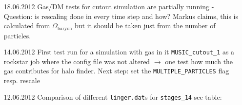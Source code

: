 \begin{itemize}
\item[18.06.2012]
Gas/DM tests for cutout simulation are partially running - Question: is 
rescaling done in every time step and how? Markus claims, this is calculated 
from $\Omega_{\text{baryon}}$ but it should be taken just from the number 
of particles. 


\item[14.06.2012]
First test run for a simulation with gas in it \texttt{MUSIC\_cutout\_1} 
as a rockstar job where the config file was not altered $\rightarrow$ 
one test how much the gas contributes for halo finder. Next step: 
set the \texttt{MULTIPLE\_PARTICLES} flag resp. rescale \\

\item[12.06.2012]
Comparison of different \texttt{linger.dat}s for \texttt{stages\_14} see table: \\


\end{itemize}
